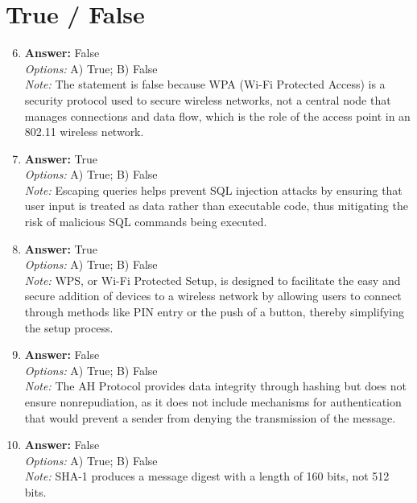 \documentclass[12pt]{article}
\begin{document}
\section*{True / False}
\begin{enumerate}[label=\arabic*.]
\setcounter{enumi}{5}
\item \textbf{Answer:} False
\\ \textit{Options:} A) True; B) False
\\ \textit{Note:} The statement is false because WPA (Wi-Fi Protected Access) is a security protocol used to secure wireless networks, not a central node that manages connections and data flow, which is the role of the access point in an 802.11 wireless network.
\item \textbf{Answer:} True
\\ \textit{Options:} A) True; B) False
\\ \textit{Note:} Escaping queries helps prevent SQL injection attacks by ensuring that user input is treated as data rather than executable code, thus mitigating the risk of malicious SQL commands being executed.
\item \textbf{Answer:} True
\\ \textit{Options:} A) True; B) False
\\ \textit{Note:} WPS, or Wi-Fi Protected Setup, is designed to facilitate the easy and secure addition of devices to a wireless network by allowing users to connect through methods like PIN entry or the push of a button, thereby simplifying the setup process.
\item \textbf{Answer:} False
\\ \textit{Options:} A) True; B) False
\\ \textit{Note:} The AH Protocol provides data integrity through hashing but does not ensure nonrepudiation, as it does not include mechanisms for authentication that would prevent a sender from denying the transmission of the message.
\item \textbf{Answer:} False
\\ \textit{Options:} A) True; B) False
\\ \textit{Note:} SHA-1 produces a message digest with a length of 160 bits, not 512 bits.
\end{enumerate}
\end{document}
